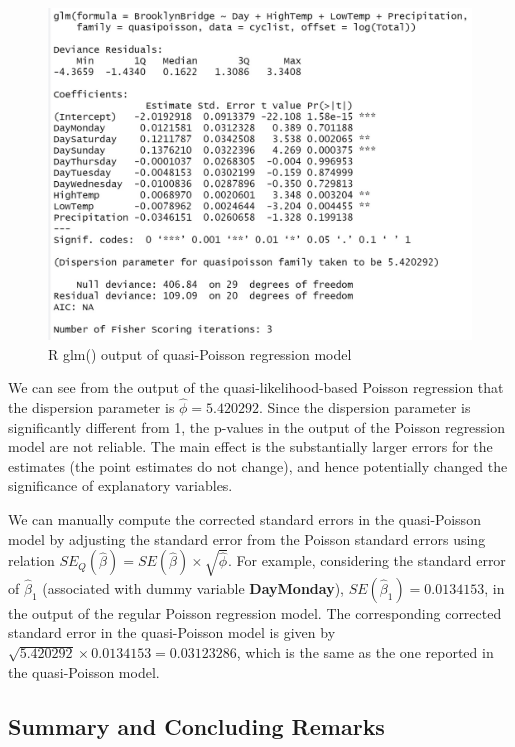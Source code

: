 \documentclass[
]{book}
\begin{document}
\begin{figure}

{\centering \includegraphics[width=15.76in]{img10/w10-QuasiPoisOutput} 

}

\caption{R glm() output of quasi-Poisson regression model}\label{fig:unnamed-chunk-155}
\end{figure}

We can see from the output of the quasi-likelihood-based Poisson regression that the dispersion parameter is \(\hat{\phi} = 5.420292\). Since the dispersion parameter is significantly different from 1, the p-values in the output of the Poisson regression model are not reliable. The main effect is the substantially larger errors for the estimates (the point estimates do not change), and hence potentially changed the significance of explanatory variables.

We can manually compute the corrected standard errors in the quasi-Poisson model by adjusting the standard error from the Poisson standard errors using relation \(SE_Q(\hat{\beta})=SE(\hat{\beta})\times \sqrt{\hat{\phi}}\). For example, considering the standard error of \(\hat{\beta}_1\) (associated with dummy variable \textbf{DayMonday}), \(SE(\hat{\beta}_1) = 0.0134153\), in the output of the regular Poisson regression model. The corresponding corrected standard error in the quasi-Poisson model is given by \(\sqrt{5.420292}\times 0.0134153 = 0.03123286\), which is the same as the one reported in the quasi-Poisson model.

\hypertarget{summary-and-concluding-remarks}{%
\subsection{Summary and Concluding Remarks}\label{summary-and-concluding-remarks}}
\end{document}
